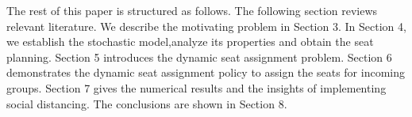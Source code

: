 

The rest of this paper is structured as follows. The following section reviews relevant literature. We describe the motivating problem in Section 3. In Section 4, we establish the stochastic model,analyze its properties and obtain the seat planning. Section 5 introduces the dynamic seat assignment problem.
Section 6 demonstrates the dynamic seat assignment policy to assign the seats for incoming groups. Section 7 gives the numerical results and the insights of implementing social distancing. The conclusions are shown in Section 8.
\newpage
